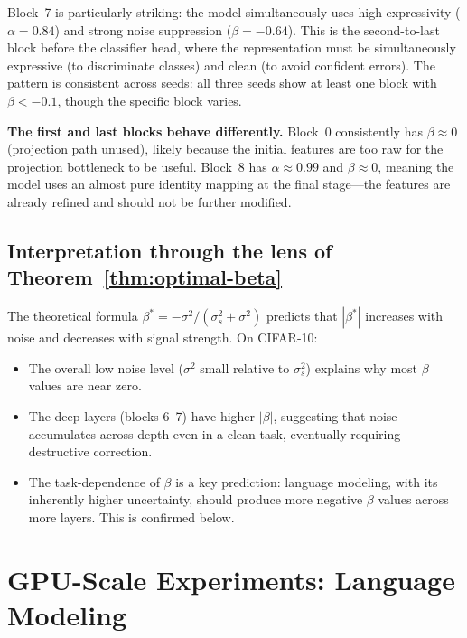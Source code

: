 \documentclass[11pt,a4paper]{article}
\theoremstyle{definition}
\begin{document}
Block~7 is particularly striking: the model simultaneously uses
high expressivity ($\alpha = 0.84$) and strong noise suppression
($\beta = -0.64$). This is the second-to-last block before the
classifier head, where the representation must be simultaneously
expressive (to discriminate classes) and clean (to avoid confident
errors). The pattern is consistent across seeds: all three seeds
show at least one block with $\beta < -0.1$, though the specific
block varies.

\textbf{The first and last blocks behave differently.}
Block~0 consistently has $\beta \approx 0$ (projection path unused),
likely because the initial features are too raw for the projection
bottleneck to be useful. Block~8 has $\alpha \approx 0.99$ and
$\beta \approx 0$, meaning the model uses an almost pure identity
mapping at the final stage---the features are already refined and
should not be further modified.

\subsection{Interpretation through the lens of Theorem~\ref{thm:optimal-beta}}

The theoretical formula $\beta^* = -\sigma^2/(\sigma_s^2 + \sigma^2)$
predicts that $|\beta^*|$ increases with noise and decreases with
signal strength. On CIFAR-10:
\begin{itemize}[nosep]
  \item The overall low noise level ($\sigma^2$ small relative to
        $\sigma_s^2$) explains why most $\beta$ values are near zero.
  \item The deep layers (blocks 6--7) have higher $|\beta|$, suggesting
        that noise accumulates across depth even in a clean task,
        eventually requiring destructive correction.
  \item The task-dependence of $\beta$ is a key prediction:
        language modeling, with its inherently higher
        uncertainty, should produce more negative $\beta$ values
        across more layers. This is confirmed below.
\end{itemize}

\section{GPU-Scale Experiments: Language Modeling}
\label{sec:lm}
\end{document}

